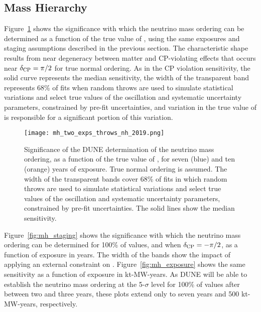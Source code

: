 \subsection{Mass Hierarchy}
\label{sec:physics-lbnosc-mh}


Figure~\ref{fig:mh_nominal} shows the significance with which the neutrino mass ordering can be determined as a function of the true value of \deltacp, using the same exposures and staging assumptions described in the previous section. The characteristic shape results from near degeneracy between matter and CP-violating effects that occurs near $\delta_{\rm CP}=\pi/2$ for true normal ordering.
As in the CP violation sensitivity, the solid curve represents the median sensitivity, the width of the transparent band represents 68\% of fits when random throws are used to simulate statistical variations and select true values of the oscillation and systematic uncertainty parameters, constrained by pre-fit uncertainties, and variation in the true value of  is responsible for a significant portion of this variation.

\begin{figure}[h!]
    \centering
		\texttt{[image: mh\_two\_exps\_throws\_nh\_2019.png]}
	\caption[Significance of the DUNE neutrino mass ordering determination, as a function of \deltacp]{Significance of the DUNE determination of the neutrino mass ordering, as a function of the true value of \deltacp, for seven (blue) and ten (orange) years of exposure. True normal ordering is assumed. The width of the transparent bands cover 68\% of fits in which random throws are used to simulate statistical variations and select true values of the oscillation and systematic uncertainty parameters, constrained by pre-fit uncertainties. The solid lines show the median sensitivity. }
    \label{fig:mh_nominal}
\end{figure}

Figure~\ref{fig:mh_staging} shows the significance
with which the neutrino mass ordering can be determined for 100\% of \deltacp values, and when $\delta_{\rm CP}=-\pi/2$, as a function of exposure in years. The width of the bands show the impact of applying an external constraint on . Figure~\ref{fig:mh_exposure} shows the same sensitivity as a function of exposure in kt-MW-years. As DUNE will be able to establish the neutrino mass ordering at the 5-$\sigma$ level for 100\% of \deltacp values after between two and three years, these plots extend only to seven years and 500 kt-MW-years, respectively.

